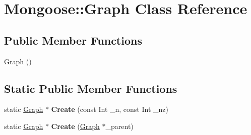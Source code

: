 \hypertarget{class_mongoose_1_1_graph}{}\section{Mongoose\+:\+:Graph Class Reference}
\label{class_mongoose_1_1_graph}
\subsection*{Public Member Functions}
\begin{DoxyCompactItemize}
\item 
\hyperlink{class_mongoose_1_1_graph_ae3987e9b47b7f787724bafd7309b8594}{Graph} ()
\end{DoxyCompactItemize}
\subsection*{Static Public Member Functions}
\begin{DoxyCompactItemize}
\item 
\hypertarget{class_mongoose_1_1_graph_ad5a7ecd3ef30772074334208dcdb52fc}{}\label{class_mongoose_1_1_graph_ad5a7ecd3ef30772074334208dcdb52fc} 
static \hyperlink{class_mongoose_1_1_graph}{Graph} $\ast$ {\bfseries Create} (const Int \+\_\+n, const Int \+\_\+nz)
\item 
\hypertarget{class_mongoose_1_1_graph_a01c9b07c238753ed8593d59cdcb1c602}{}\label{class_mongoose_1_1_graph_a01c9b07c238753ed8593d59cdcb1c602} 
static \hyperlink{class_mongoose_1_1_graph}{Graph} $\ast$ {\bfseries Create} (\hyperlink{class_mongoose_1_1_graph}{Graph} $\ast$\+\_\+parent)
\end{DoxyCompactItemize}
